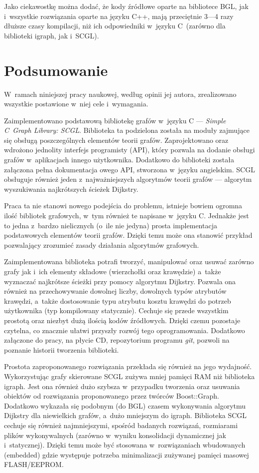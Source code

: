 \documentclass[a4paper,12pt,polish,oneside,openright]{thesis}
\begin{document}
Jako ciekawostkę można dodać, że kody źródłowe oparte na bibliotece BGL, jak i~wszystkie rozwiązania oparte na języku C++, mają przeciętnie 3---4 razy dłuższe czasy kompilacji, niż ich odpowiedniki w~języku C~(zarówno dla biblioteki igraph, jak i~SCGL).


\chapter*{Podsumowanie}
W~ramach niniejszej pracy naukowej, według opinii jej autora, zrealizowano wszystkie postawione w~niej cele i~wymagania.

Zaimplementowano podstawową bibliotekę grafów w~języku C --- \emph{Simple C~Graph Library: SCGL}.
Biblioteka ta podzielona została na moduły zajmujące się obsługą poszczególnych elementów teorii grafów.
Zaprojektowano oraz wdrożono jednolity interfejs programisty (API), który pozwala na dodanie obsługi grafów w~aplikacjach innego użytkownika.
Dodatkowo do biblioteki została załączona pełna dokumentacja owego API, stworzona w~języku angielskim.
SCGL obsługuje również jeden z~najważniejszych algorytmów teorii grafów --- algorytm wyszukiwania najkrótszych ścieżek Dijkstry.

Praca ta nie stanowi nowego podejścia do problemu, istnieje bowiem ogromna ilość bibliotek grafowych, w~tym również te napisane w~języku C. Jednakże jest to jedna z~bardzo nielicznych (o~ile nie jedyna) prosta implementacja podstawowych elementów teorii grafów. Dzięki temu może ona stanowić przykład pozwalający zrozumieć zasady działania algorytmów grafowych.

Zaimplementowana biblioteka potrafi tworzyć, manipulować oraz usuwać zarówno grafy jak i~ich elementy składowe (wierzchołki oraz krawędzie) a~także wyznaczać najkrótsze ścieżki przy pomocy algorytmu Dijkstry.
Pozwala ona również na przechowywanie dowolnej liczby, dowolnych typów atrybutów krawędzi, a~także dostosowanie typu atrybutu kosztu krawędzi do potrzeb użytkownika (typ kompilowany statycznie).
Cechuje się przede wszystkim prostotą oraz niezbyt dużą ilością kodów źródłowych.
Dzięki czemu pozostaje czytelna, co znacznie ułatwi przyszły rozwój tego oprogramowania.
Dodatkowo załączone do pracy, na płycie CD, repozytorium programu \emph{git}, pozwoli na poznanie historii tworzenia biblioteki.

Prostota zaproponowanego rozwiązania przekłada się również na jego wydajność.
Wykorzystując grafy skierowane SCGL zużywa mniej pamięci RAM niż biblioteka igraph.
Jest ona również dużo szybsza w~przypadku tworzenia oraz usuwania obiektów od rozwiązania proponowanego przez twórców Boost::Graph.
Dodatkowo wykazała się podobnym (do BGL) czasem wykonywania algorytmu Dijkstry dla niewielkich grafów, a~dużo mniejszym do igraph.
Biblioteka SCGL cechuje się również najmniejszymi, spośród badanych rozwiązań, rozmiarami plików wykonywalnych (zarówno w~wyniku konsolidacji dynamicznej jak i~statycznej).
Dzięki temu może być stosowana w~rozwiązaniach wbudowanych (embedded) gdzie występuje potrzeba minimalizacji zużywanej pamięci masowej FLASH/EEPROM.
\end{document}
